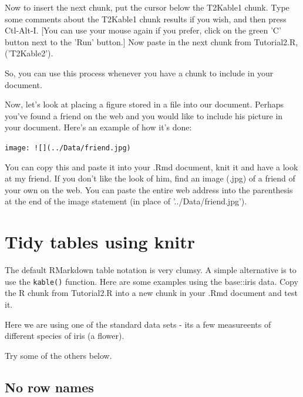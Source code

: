 \documentclass[titlepage]{book}\usepackage{knitr}
\begin{document}
Now to insert the next chunk, put the cursor below the T2Kable1 chunk.  Type some comments about the T2Kable1 chunk results if you wish, and then press Ctl-Alt-I. [You can use your mouse again if you prefer, click on the green 'C' button next to the 'Run' button.]
Now paste in the next chunk from Tutorial2.R, ('T2Kable2').

So, you can use this process whenever you have a chunk to include in your document.

Now, let's look at placing a figure stored in a file into our document.
Perhaps you've found a friend on the web and you would like to include his picture in your document.  Here's an example of how it's done:

\verb+image: ![](../Data/friend.jpg)+

You can copy this and paste it into your .Rmd document, knit it and have a look at my friend. If you don't like the look of him, find an image (.jpg) of a friend of your own on the web.  You can paste the entire web address into the parenthesis at the end of the image statement (in place of '../Data/friend.jpg').


\section{Tidy tables using knitr}
The default RMarkdown table notation is very clumsy. A simple alternative is to use the 
\texttt{kable()} function. Here are some examples using the base::iris data. Copy the R chunk from Tutorial2.R into a new chunk in your .Rmd document and test it.

Here we are using one of the standard data sets - its a few measureents of different species of iris (a flower).

Try some of the others below.

\begin{knitrout}
\color{fgcolor}\begin{kframe}
\begin{alltt}
\hlstd{(}
\hlstd{(} \hlstd{))}
\end{alltt}
\end{kframe}
\end{knitrout}

\subsection{No row names}
\end{document}
